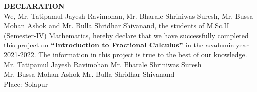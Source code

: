 \documentclass[a4paper,14pt,oneside]{book}
\theoremstyle{plain}
\theoremstyle{definition}
\theoremstyle{remark}
\begin{document}
\begin{titlepage}
\begin{center}
\newpage
\vspace*{4cm}
\begin{center}
\textbf{DECLARATION}  \\
\justify
\Large{
We, Mr. Tatipamul Jayesh Ravimohan, Mr. Bharale Shriniwas Suresh, Mr. Bussa Mohan Ashok and Mr. Bulla Shridhar Shivanand, the students of M.Sc.II (Semester-IV) Mathematics, hereby declare that we have successfully completed this project on \textbf{\enquote{Introduction to Fractional Calculus}} in the academic year 2021-2022. The information in this project is true to the best of our knowledge.\\\flushleft Mr. Tatipamul Jayesh Ravimohan \hfill Mr. Bharale Shriniwas Suresh\\ 
\vspace{1.5cm}\flushleft Mr. Bussa Mohan Ashok  \hfill Mr. Bulla Shridhar Shivanand \\
\vspace{5.5cm}
\hspace{8cm} Place: Solapur}
\end{center}


\end{center}
\end{titlepage}
\end{document}
